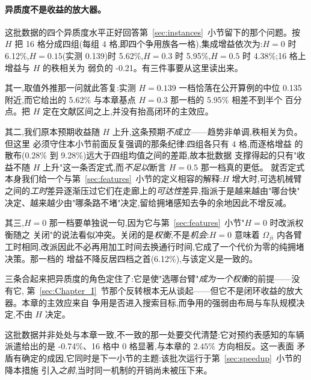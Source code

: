 \documentclass[manuscript,screen,review]{acmart}
\newcommand{\GainProbeLoop}{2.45\%}      %
\newcommand{\MatrixCells}{16}
\newcommand{\GainIntegMatrixLo}{0.28\%}
\newcommand{\GainIntegMatrixHi}{9.28\%}
\newcommand{\GainProbePre}{-0.74\%}      %
\newcommand{\GainIntegHZero}{6.12\%}
\newcommand{\GainIntegHLow}{5.62\%}      %
\newcommand{\GainIntegHMid}{5.95\%}      %
\newcommand{\GainIntegHHigh}{4.38\%}     %
\newcommand{\MatrixHMeasLow}{0.139}      %
\newcommand{\RhoIntegH}{-0.21}           %
\newcommand{\PubHMed}{0.135}             %
\begin{document}
\paragraph{异质度不是收益的放大器。}
这批数据的四个异质度水平正好回答第~\ref{sec:instances}~小节留下的那个问题。按 $H$ 把
\MatrixCells{} 格分成四组(每组 $4$ 格,即四个争用族各一格),集成增益依次为:$H=0$ 时
\GainIntegHZero{},$H=0.15$(实测 \MatrixHMeasLow{})时 \GainIntegHLow{},$H=0.3$ 时
\GainIntegHMid{},$H=0.5$ 时 \GainIntegHHigh{};\MatrixCells{} 格上增益与 $H$ 的秩相关为
弱负的 \RhoIntegH{}。有三件事要从这里读出来。

其一,取值外推那一问就此答复:实测 $H=\MatrixHMeasLow$ 一档恰落在公开算例的中位 \PubHMed{}
附近,而它给出的 \GainIntegHLow{} 与本章基点 $H=0.3$ 那一档的 \GainIntegHMid{} 相差不到半个
百分点。把 $H$ 定在文献区间之上,并没有抬高闭环的主效应。

其二,我们原本预期收益随 $H$ 上升,这条预期\emph{不成立}——趋势非单调,秩相关为负。但这里
必须守住本小节前面反复强调的那条纪律:四组各只有 $4$ 格,而逐格增益
的散布(\GainIntegMatrixLo{} 到 \GainIntegMatrixHi{})远大于四组均值之间的差距,故本批数据
支撑得起的只有"收益不随 $H$ 上升"这一条否定式,而\emph{不足以}断言 $H=0.5$ 那一档真的更低。
就否定式本身我们给一个与第~\ref{sec:features}~小节的定义相容的解释:$H$ 增大时,可选机械臂
之间的\emph{工时}差异逐渐压过它们在走廊上的\emph{可达性}差异,指派于是越来越由"哪台快"
决定、越来越少由"哪条路不堵"决定,留给拥堵感知去争的余地因此不增反减。

其三,$H=0$ 那一档要单独说一句,因为它与第~\ref{sec:features}~小节"$H=0$ 时改派权衡随之
关闭"的说法看似冲突。关闭的是\emph{权衡},不是\emph{机会}:$H=0$ 意味着 $\Omega_{ji}$ 内各臂
工时相同,改派因此不必再用加工时间去换通行时间,它成了一个代价为零的纯拥堵决策。那一档的
增益不降反居四档之首(\GainIntegHZero{}),与该定义是一致的。

三条合起来把异质度的角色定住了:它是使"选哪台臂"\emph{成为一个权衡}的前提——没有它,
第~\ref{sec:Chapter_I}~节那个反转根本无从谈起——但它不是闭环收益的放大器。本章的主效应来自
争用是否进入搜索目标,而争用的强弱由布局与车队规模决定,不由 $H$ 决定。

这批数据并非处处与本章一致,不一致的那一处要交代清楚:它对预约表感知的车辆派遣给出的是
\GainProbePre{}、\MatrixCells{} 格中 $0$ 格显著,与本章的 $\GainProbeLoop$ 方向相反。这一表面
矛盾有确定的成因,它同时是下一小节的主题:该批次运行于第~\ref{sec:speedup}~小节的降本措施
引入\emph{之前},当时同一机制的开销尚未被压下来。

\end{document}
